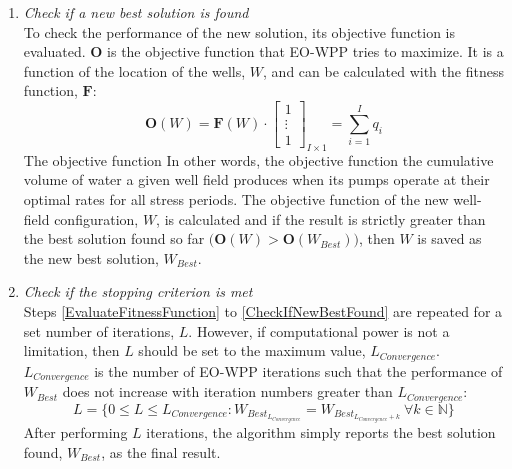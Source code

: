 \documentclass[authoryear]{elsarticle}
\begin{document}
\begin{enumerate}[Step 1:]
\item \label{CheckIfNewBestFound}
\textit{Check if a new best solution is found}\\
To check the performance of the new solution, its objective function is evaluated. $\mathbf{O}$ is the objective function that EO-WPP tries to maximize. It is a function of the location of the wells, $W$, and can be calculated with the fitness function, $\mathbf{F}$:
\begin{equation}\label{ObjectiveFunction}
  \mathbf{O}(W) = \mathbf{F}(W)\cdot \begin{bmatrix}1\\\vdots\\1\end{bmatrix}_{I\times1} = \sum_{i=1}^{I} q_{i}
\end{equation}
 The objective function  In other words, the objective function  the cumulative volume of water a given well field produces when its pumps operate at their optimal rates for all stress periods.
The objective function of the new well-field configuration, $W$, is calculated and if the result is strictly greater than the best solution found so far $\big(\mathbf{O}(W)>\mathbf{O}(W_{Best})\big)$, then $W$ is saved as the new best solution, $W_{Best}$.

\item
\textit{Check if the stopping criterion is met}\\
Steps \ref{EvaluateFitnessFunction} to \ref{CheckIfNewBestFound} are repeated for a set number of iterations, $L$. However, if computational power is not a limitation, then $L$ should be set to the maximum value, $L_{Convergence}$. $L_{Convergence}$ is the number of EO-WPP iterations such that the performance of $W_{Best}$ does not increase with iteration numbers greater than $L_{Convergence}$:
\begin{equation}\label{ObjectiveFunction}
  L = \bigg\{0\le L\le L_{Convergence}:W_{Best_{L_{Convergence}}}=W_{Best_{L_{Convergence}+k}}\ \forall k \in \mathbb{N} \bigg\}
\end{equation}
After performing $L$ iterations, the algorithm simply reports the best solution found, $W_{Best}$, as the final result.

\end{enumerate}
\end{document}
